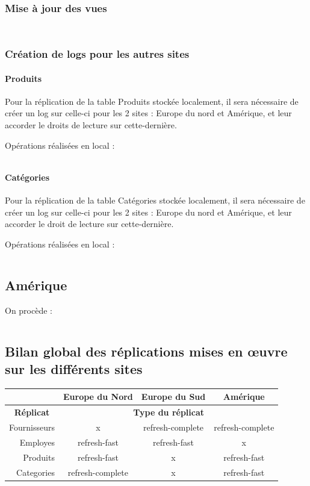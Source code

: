 \documentclass[10pt,a4paper]{article}
\theoremstyle{plain}
\begin{document}
\subsubsection{Mise à jour des vues}

\inputminted{sql}{EUS_V-B-5-1.sql}

\inputminted{sql}{EUS_V-B-5-2.sql}

\subsubsection{Création de logs pour les autres sites}

\paragraph{Produits}
Pour la réplication de la table Produits stockée localement, il sera nécessaire de créer un log sur celle-ci pour les 2 sites : Europe du nord et Amérique, et leur accorder le droits de lecture sur cette-dernière.

Opérations réalisées en local :
\inputminted{sql}{EUS_VI-1.sql}

\paragraph{Catégories}
Pour la réplication de la table Catégories stockée localement, il sera nécessaire de créer un log sur celle-ci pour les 2 sites : Europe du nord et Amérique, et leur accorder le droit de lecture sur cette-dernière.

Opérations réalisées en local :
\inputminted{sql}{EUS_VI-2.sql}
\newpage

\newpage 

\subsection{Amérique}
On procède :
\inputminted{sql}{AM_Replica.sql}

\subsection{Bilan global des réplications mises en \oe uvre sur les différents sites}
\begin{table}[H]
\centering
\begin{tabular}{|r|c|c|c|}
\hline
\multicolumn{1}{|l|}{} & \textbf{Europe du Nord} & \textbf{Europe du Sud} & \textbf{Amérique} \\ \hline
\multicolumn{1}{|c|}{\textbf{Réplicat}} & \multicolumn{3}{c|}{\textbf{Type du réplicat}} \\ \hline
Fournisseurs & x & refresh-complete & refresh-complete \\ \hline
Employes & refresh-fast & refresh-fast & x \\ \hline
Produits & refresh-fast & x & refresh-fast \\ \hline
Categories & refresh-complete & x & refresh-fast \\ \hline
\end{tabular}
\end{table}
\end{document}
